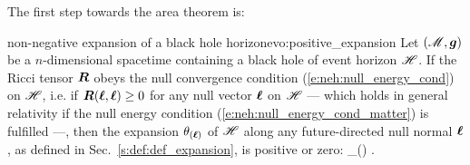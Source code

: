 The first step towards the area theorem is:

\begin{tprop}{non-negative expansion of a black hole horizon}{evo:positive_expansion}
Let $(\mathscr{M},\bm{g})$ be a $n$-dimensional spacetime containing a black hole
of event horizon $\mathscr{H}$. If the Ricci tensor $\bm{R}$ obeys the null
convergence condition (\ref{e:neh:null_energy_cond}) on $\mathscr{H}$, i.e. if
$\bm{R}(\bm{\ell}, \bm{\ell}) \geq 0$ for any null vector $\bm{\ell}$ on $\mathscr{H}$
--- which holds in general relativity if the null energy condition (\ref{e:neh:null_energy_cond_matter}) is fulfilled ---, then the
expansion $\theta_{(\bm{\ell})}$ of $\mathscr{H}$ along any future-directed null
normal $\bm{\ell}$, as defined in Sec.~\ref{s:def:def_expansion}, is positive or zero:
\be \label{e:evo:theta_positive}
    \theta_{(\wl)}  .
\ee
\end{tprop}

